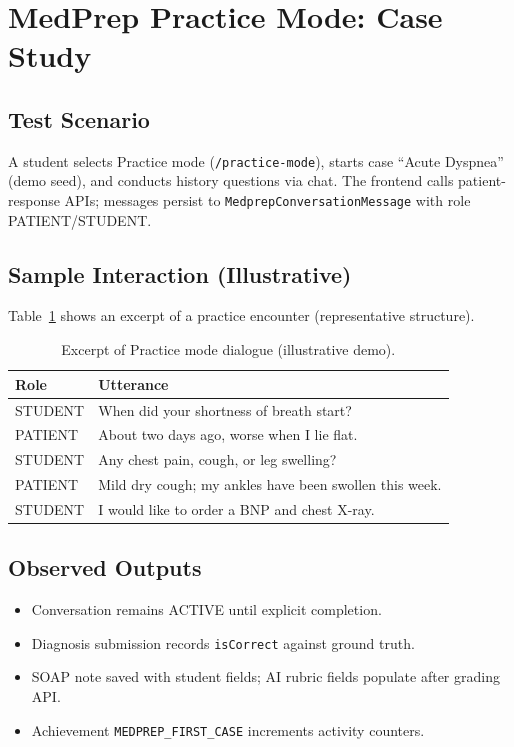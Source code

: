 \section{MedPrep Practice Mode: Case Study}
\subsection{Test Scenario}
A student selects Practice mode (\texttt{/practice-mode}), starts case ``Acute Dyspnea'' (demo seed), and conducts history questions via chat. The frontend calls patient-response APIs; messages persist to \texttt{MedprepConversationMessage} with role PATIENT/STUDENT.

\subsection{Sample Interaction (Illustrative)}
Table~\ref{tab:practice-dialogue} shows an excerpt of a practice encounter (representative structure).

\begin{table}[htbp]
  \centering
  \caption{Excerpt of Practice mode dialogue (illustrative demo).}
  \label{tab:practice-dialogue}
  \small
  \begin{tabular}{@{}p{1.5cm}p{10.5cm}@{}}
    \toprule
    \textbf{Role} & \textbf{Utterance} \\
    \midrule
    STUDENT & When did your shortness of breath start? \\
    PATIENT & About two days ago, worse when I lie flat. \\
    STUDENT & Any chest pain, cough, or leg swelling? \\
    PATIENT & Mild dry cough; my ankles have been swollen this week. \\
    STUDENT & I would like to order a BNP and chest X-ray. \\
    \bottomrule
  \end{tabular}
\end{table}

\subsection{Observed Outputs}
\begin{itemize}
  \item Conversation remains ACTIVE until explicit completion.
  \item Diagnosis submission records \texttt{isCorrect} against ground truth.
  \item SOAP note saved with student fields; AI rubric fields populate after grading API.
  \item Achievement \texttt{MEDPREP\_FIRST\_CASE} increments activity counters.
\end{itemize}

